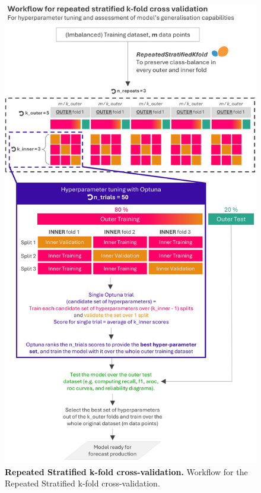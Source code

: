 \begin{figure}[htbp]
\centering
\includegraphics[width=\textwidth]{train_model.png}
\caption{\textbf{Repeated Stratified k-fold cross-validation.} Workflow for the Repeated Stratified k-fold cross-validation.}
\label{fig:train_model}
\end{figure}


